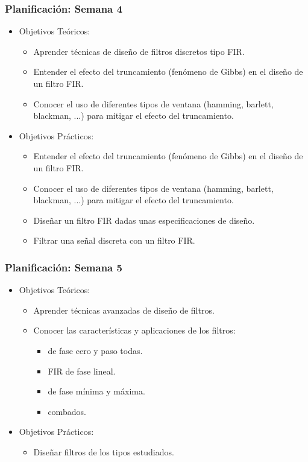\begin{frame}
  \frametitle{Planificación: Semana 4}
  \begin{itemize}
    \item Objetivos Teóricos:
    \begin{itemize}
      \item Aprender técnicas de diseño de filtros discretos tipo FIR.
      \item Entender el efecto del truncamiento (fenómeno de Gibbs) en el diseño de un filtro FIR.
      \item Conocer el uso de diferentes tipos de ventana (hamming, barlett, blackman, ...) para mitigar el efecto del truncamiento.
    \end{itemize}
    \item Objetivos Prácticos:
    \begin{itemize}
      \item Entender el efecto del truncamiento (fenómeno de Gibbs) en el diseño de un filtro FIR.
      \item Conocer el uso de diferentes tipos de ventana (hamming, barlett, blackman, ...) para mitigar el efecto del truncamiento.
      \item Diseñar un filtro FIR dadas unas especificaciones de diseño.
      \item Filtrar una señal discreta con un filtro FIR.
    \end{itemize}
  \end{itemize}
\end{frame}

\begin{frame}
  \frametitle{Planificación: Semana 5}
  \begin{itemize}
    \item Objetivos Teóricos:
    \begin{itemize}
      \item Aprender técnicas avanzadas de diseño de filtros.
      \item Conocer las características y aplicaciones de los filtros: 
      \begin{itemize}
        \item de fase cero y paso todas.
        \item FIR de fase lineal.
        \item de fase mínima y máxima.
        \item combados.
      \end{itemize}
    \end{itemize}
    \item Objetivos Prácticos:
    \begin{itemize}
      \item Diseñar filtros de los tipos estudiados.
    \end{itemize}
  \end{itemize}
\end{frame}

